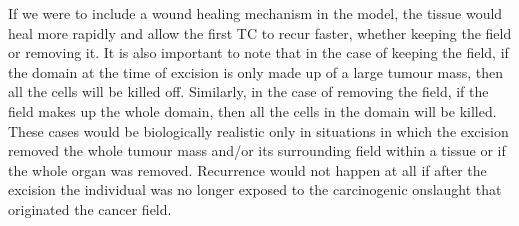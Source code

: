 \documentclass[\main/thesis.tex]{subfiles}
\begin{document}
If we were to include a wound healing mechanism in the model, the tissue would heal more rapidly and allow the first TC to recur faster, whether keeping the field or removing it. It is also important to note that in the case of keeping the field, if the domain at the time of excision is only made up of a large tumour mass, then all the cells will be killed off. Similarly, in the case of removing the field, if the field makes up the whole domain, then all the cells in the domain will be killed. These cases would be biologically realistic only in situations in which the excision removed the whole tumour mass and/or its surrounding field within a tissue or if the whole organ was removed. Recurrence would not happen at all if after the excision the individual was no longer exposed to the carcinogenic onslaught that originated the cancer field.
\end{document}
